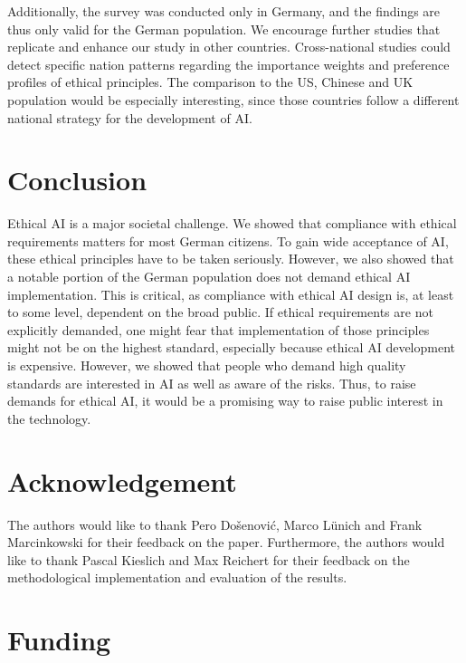 \documentclass{article}
\begin{document}
Additionally, the survey was conducted only in Germany, and the findings
are thus only valid for the German population. We encourage further
studies that replicate and enhance our study in other countries.
Cross-national studies could detect specific nation patterns regarding
the importance weights and preference profiles of ethical principles.
The comparison to the US, Chinese and UK population would be especially
interesting, since those countries follow a different national strategy
for the development of AI.

\hypertarget{conclusion}{%
\section{Conclusion}\label{conclusion}}

Ethical AI is a major societal challenge. We showed that compliance with
ethical requirements matters for most German citizens. To gain wide
acceptance of AI, these ethical principles have to be taken seriously.
However, we also showed that a notable portion of the German population
does not demand ethical AI implementation. This is critical, as
compliance with ethical AI design is, at least to some level, dependent
on the broad public. If ethical requirements are not explicitly
demanded, one might fear that implementation of those principles might
not be on the highest standard, especially because ethical AI
development is expensive. However, we showed that people who demand high
quality standards are interested in AI as well as aware of the risks.
Thus, to raise demands for ethical AI, it would be a promising way to
raise public interest in the technology.

\hypertarget{acknowledgement}{%
\section*{Acknowledgement}\label{acknowledgement}}

The authors would like to thank Pero Došenović, Marco Lünich and Frank
Marcinkowski for their feedback on the paper. Furthermore, the authors
would like to thank Pascal Kieslich and Max Reichert for their feedback
on the methodological implementation and evaluation of the results.

\hypertarget{funding}{%
\section*{Funding}\label{funding}}
\end{document}
